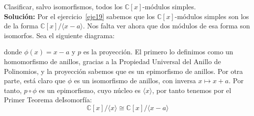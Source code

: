\begin{ejerciciostar}
    Clasificar, salvo isomorfismos, todos los $\mathbb{C}[x]$-módulos simples. \\
    
    \noindent
    \textbf{Solución:}
    Por el ejercicio~\ref{eje19} sabemos que los $\mathbb{C}[x]$-módulos simples son los de la forma $\mathbb{C}[x]/\langle x-a \rangle $. Nos falta ver ahora que dos módulos de esa forma son isomorfos. Sea el siguiente diagrama:
    \begin{figure}[H]
        \centering
    \end{figure}
    donde $\phi(x) = x-a$ y $p$ es la proyección. El primero lo  definimos como un homomorfismo de anillos, gracias a la Propiedad Universal del Anillo de Polinomios, y la proyección sabemos que es un epimorfismo de anillos. Por otra parte, está claro que $\phi $ es un isomorfismo de anillos, con inversa $x \mapsto x+a$. Por tanto, $p \circ \phi $ es un epimorfismo, cuyo núcleo es $\langle x \rangle $, por tanto tenemos por el Primer Teorema deIsomorfía:
    \begin{equation*}
        \mathbb{C}[x]/\langle x \rangle \cong \mathbb{C}[x]/\langle x-a \rangle 
    \end{equation*}
\end{ejerciciostar}

